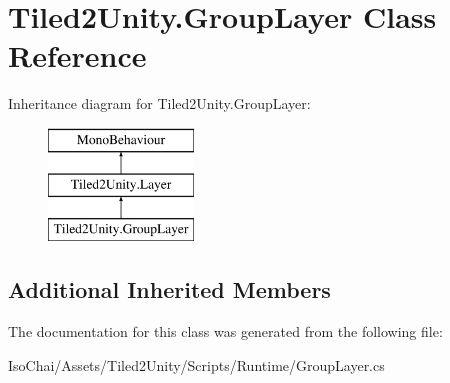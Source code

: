 \hypertarget{class_tiled2_unity_1_1_group_layer}{}\section{Tiled2\+Unity.\+Group\+Layer Class Reference}
\label{class_tiled2_unity_1_1_group_layer}
Inheritance diagram for Tiled2\+Unity.\+Group\+Layer\+:\begin{figure}[H]
\begin{center}
\leavevmode
\includegraphics[height=3.000000cm]{class_tiled2_unity_1_1_group_layer}
\end{center}
\end{figure}
\subsection*{Additional Inherited Members}


The documentation for this class was generated from the following file\+:\begin{DoxyCompactItemize}
\item 
Iso\+Chai/\+Assets/\+Tiled2\+Unity/\+Scripts/\+Runtime/Group\+Layer.\+cs\end{DoxyCompactItemize}
